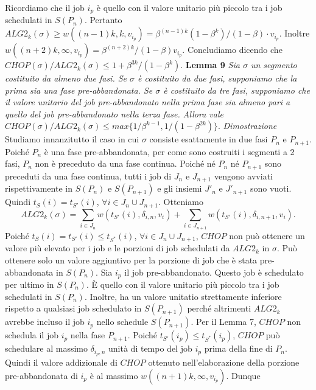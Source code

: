 \documentclass[twoside,openany,titlepage,fleqn,
	headinclude,12pt,a4paper,BCOR5mm,footinclude]{scrbook}
\begin{document}
Ricordiamo che il job $i_{p}$ è quello con il valore unitario più piccolo tra i job schedulati in $S(P_{n})$. Pertanto $ALG2_{k}(\sigma) \geq w((n - 1) k, k, v_{i_{p}}) = \beta^{(n - 1)k} (1 - \beta^{k}) / (1 -\beta) \cdot v_{i_{p}}$. Inoltre $w((n + 2) k, \infty, v_{i_{p}}) = \beta^{(n + 2) k} / (1 - \beta) v_{i_{p}}$. Concludiamo dicendo che $CHOP(\sigma) / ALG2_{k}(\sigma) \leq 1 + \beta^{3k} / (1 - \beta^{k})$.
\newline \newline
\textbf{Lemma 9}
\textit{Sia $\sigma$ un segmento costituito da almeno due fasi. Se $\sigma$ è costituito da due fasi, supponiamo che la prima sia una fase pre-abbandonata. Se $\sigma$ è costituito da tre fasi, supponiamo che il valore unitario del job pre-abbandonato nella prima fase sia almeno pari a quello del job pre-abbandonato nella terza fase. Allora vale $CHOP(\sigma) / ALG2_{k}(\sigma) \leq max\{1 / \beta^{k - 1}, 1 / (1 - \beta^{2k})\}.$}
\newline \newline
\textit{Dimostrazione}
Studiamo innanzitutto il caso in cui $\sigma$ consiste esattamente in due fasi $P_{n}$ e $P_{n+1}$. Poiché $P_{n}$ è una fase pre-abbandonata, per come sono costruiti i segmenti a 2 fasi, $P_{n}$ non è preceduto da una fase continua. Poiché né $P_{n}$ né $P_{n+1}$ sono preceduti da una fase continua, tutti i job di $J_{n}$ e $J_{n+1}$ vengono avviati rispettivamente in $S(P_{n})$ e $S(P_{n+1})$ e gli insiemi $J'_{n}$ e $J'_{n+1}$ sono vuoti. Quindi $t_{S}(i) = t_{S'}(i)$, $\forall i \in J_{n} \cup J_{n+1}$. Otteniamo
\begin{equation}
ALG2_{k} (\sigma) = \sum_{i \in J_{n}} w (t_{S'}(i), \delta_{i,n}, v_{i}) + \sum_{i \in J_{n + 1}} w (t_{S'}(i), \delta_{i, n + 1}, v_{i}). \tag*{(1)}
\end{equation}
Poiché $t_{S}(i) = t_{S'}(i) \leq t_{S^{*}}(i)$, $\forall i \in J_{n} \cup J_{n+1}$, $CHOP$ non può ottenere un valore più elevato per i job e le porzioni di job schedulati da $ALG2_{k}$ in $\sigma$. Può ottenere solo un valore aggiuntivo per la porzione di job che è stata pre-abbandonata in $S(P_{n})$. Sia $i_{p}$ il job pre-abbandonato. Questo job è schedulato per ultimo in $S(P_{n})$. È quello con il valore unitario più piccolo tra i job schedulati in $S(P_{n})$. Inoltre, ha un valore unitatio strettamente inferiore rispetto a qualsiasi job schedulato in $S(P_{n+1})$ perché altrimenti $ALG2_{k}$ avrebbe incluso il job $i_{p}$ nello schedule $S(P_{n+1})$. Per il Lemma 7, $CHOP$ non schedula il job $i_{p}$ nella fase $P_{n+1}$. Poiché $t_{S'}(i_{p}) \leq t_{S^{*}}(i_{p})$, $CHOP$ può schedulare al massimo $\delta_{i_{p}, n}$ unità di tempo del job $i_{p}$ prima della fine di $P_{n}$. Quindi il valore addizionale di $CHOP$ ottenuto nell'elaborazione della porzione pre-abbandonata di $i_{p}$ è al massimo $w((n + 1) k, \infty, v_{i_{p}})$. Dunque
\end{document}
